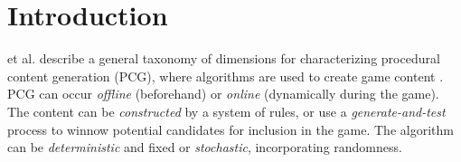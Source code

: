 \documentclass[journal]{IEEEtran}
\begin{document}
%
\IEEEpeerreviewmaketitle


\ifCLASSOPTIONcompsoc
{}
\else
\section{Introduction}
\label{sec:introduction}
\fi




% 
% 
% 
% 

 et al. \cite{SBPCG} describe a general taxonomy of dimensions for characterizing procedural content generation (PCG), where algorithms are used to create game content \cite{PCGSURVEY}. PCG can occur {\it offline} (beforehand) or {\it online} (dynamically during the game). The content can be {\it constructed}
by a system of rules, or use a {\it generate-and-test} process to winnow potential candidates for inclusion in the game.
The algorithm can be {\it deterministic} and fixed or {\it stochastic}, incorporating randomness.
\end{document}
